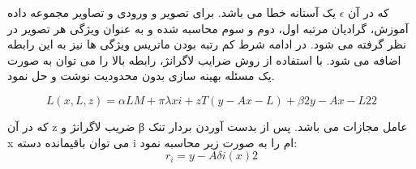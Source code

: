 که در آن
$\epsilon$
یک آستانه خطا می باشد. برای تصویر و ورودی و تصاویر مجموعه داده آموزش، گرادیان مرتبه اول، دوم و سوم محاسبه شده و به عنوان ویژگی هر تصویر در نظر گرفته می شود. در ادامه شرط کم رتبه بودن ماتریس ویژگی ها نیز به این رابطه اضافه می شود. با استفاده از روش ضرایب لاگرانژ، رابطه بالا را می توان به صورت یک مسئله بهینه سازی بدون محدودیت نوشت و حل نمود.

\begin{equation}\label{eq3-13}
L(x,L,z)=\alpha LM+πλxi+zT(y-Ax-L)+β2y-Ax-L22
\end{equation}


که در آن z ضریب لاگرانژ و β عامل مجازات می باشد. پس از بدست آوردن بردار تنک x می توان باقیمانده دسته i ام را به صورت زیر محاسبه نمود:
\begin{equation}\label{eq3-14}
r_i=y-Aδi(x)2
\end{equation}‏


